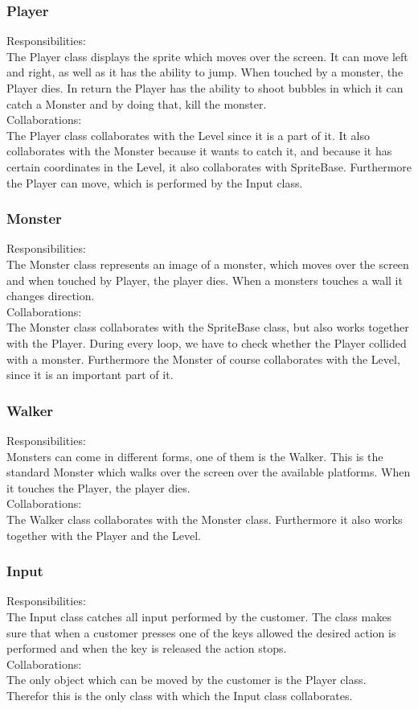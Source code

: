 \subsubsection{Player}
Responsibilities: \\
The Player class displays the sprite which moves over the screen. It can move left and right, as well as it has the ability to jump. When touched by a monster, the Player dies. In return the Player has the ability to shoot bubbles in which it can catch a Monster and by doing that, kill the monster. \\
Collaborations: \\
The Player class collaborates with the Level since it is a part of it. It also collaborates with the Monster because it wants to catch it, and because it has certain coordinates in the Level, it also collaborates with SpriteBase. Furthermore the Player can move, which is performed by the Input class. 

\subsubsection{Monster}
Responsibilities: \\
The Monster class represents an image of a monster, which moves over the screen and when touched by Player, the player dies. When a monsters touches a wall it changes direction. \\
Collaborations: \\
The Monster class collaborates with the SpriteBase class, but also works together with the Player. During every loop, we have to check whether the Player collided with a monster. Furthermore the Monster of course collaborates with the Level, since it is an important part of it. 

\subsubsection{Walker}
Responsibilities: \\
Monsters can come in different forms, one of them is the Walker. This is the standard Monster which walks over the screen over the available platforms. When it touches the Player, the player dies. \\
Collaborations: \\
The Walker class collaborates with the Monster class. Furthermore it also works together with the Player and the Level. 

\subsubsection{Input}
Responsibilities: \\
The Input class catches all input performed by the customer. The class makes sure that when a customer presses one of the keys allowed the desired action is performed and when the key is released the action stops. \\
Collaborations: \\
The only object which can be moved by the customer is the Player class. Therefor this is the only class with which the Input class collaborates. 

